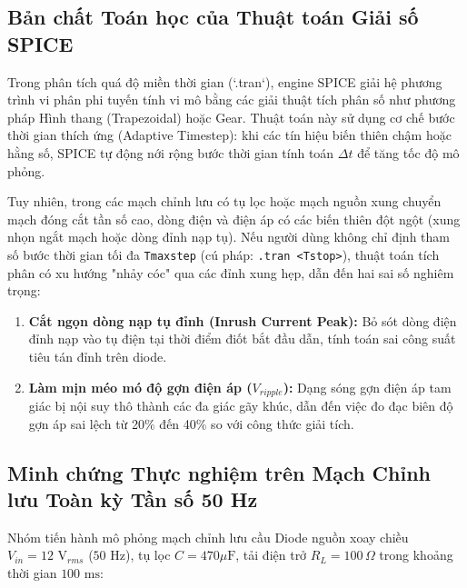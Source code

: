 \documentclass[12pt,a4paper]{report}
\begin{document}
\subsection{Bản chất Toán học của Thuật toán Giải số SPICE}
Trong phân tích quá độ miền thời gian (`.tran`), engine SPICE giải hệ phương trình vi phân phi tuyến tính vi mô bằng các giải thuật tích phân số như phương pháp Hình thang (Trapezoidal) hoặc Gear. Thuật toán này sử dụng cơ chế bước thời gian thích ứng (Adaptive Timestep): khi các tín hiệu biến thiên chậm hoặc hằng số, SPICE tự động nới rộng bước thời gian tính toán $\Delta t$ để tăng tốc độ mô phỏng.

Tuy nhiên, trong các mạch chỉnh lưu có tụ lọc hoặc mạch nguồn xung chuyển mạch đóng cắt tần số cao, dòng điện và điện áp có các biến thiên đột ngột (xung nhọn ngắt mạch hoặc dòng đỉnh nạp tụ). Nếu người dùng không chỉ định tham số bước thời gian tối đa \lstinline|Tmaxstep| (cú pháp: \lstinline|.tran <Tstop>|), thuật toán tích phân có xu hướng "nhảy cóc" qua các đỉnh xung hẹp, dẫn đến hai sai số nghiêm trọng:
\begin{enumerate}
    \item \textbf{Cắt ngọn dòng nạp tụ đỉnh (Inrush Current Peak):} Bỏ sót dòng điện đỉnh nạp vào tụ điện tại thời điểm điốt bắt đầu dẫn, tính toán sai công suất tiêu tán đỉnh trên diode.
    \item \textbf{Làm mịn méo mó độ gợn điện áp ($V_{ripple}$):} Dạng sóng gợn điện áp tam giác bị nội suy thô thành các đa giác gãy khúc, dẫn đến việc đo đạc biên độ gợn áp sai lệch từ 20\% đến 40\% so với công thức giải tích.
\end{enumerate}

\subsection{Minh chứng Thực nghiệm trên Mạch Chỉnh lưu Toàn kỳ Tần số 50 Hz}
Nhóm tiến hành mô phỏng mạch chỉnh lưu cầu Diode nguồn xoay chiều $V_{in} = 12\text{ V}_{rms}$ ($50\text{ Hz}$), tụ lọc $C = 470\mu\text{F}$, tải điện trở $R_L = 100\,\Omega$ trong khoảng thời gian $100\text{ ms}$:
\end{document}
